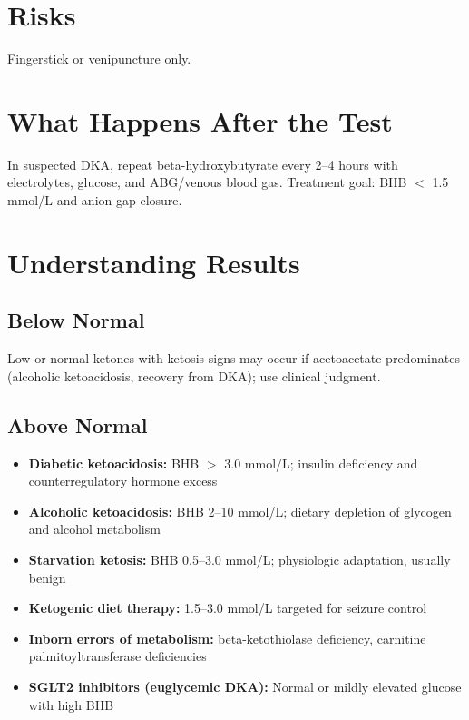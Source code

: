 \section*{Risks}
Fingerstick or venipuncture only.

\section*{What Happens After the Test}
In suspected DKA, repeat beta-hydroxybutyrate every 2--4 hours with electrolytes, glucose, and ABG/venous blood gas. Treatment goal: BHB $<$ 1.5 mmol/L and anion gap closure.

\section*{Understanding Results}

\subsection*{Below Normal}
Low or normal ketones with ketosis signs may occur if acetoacetate predominates (alcoholic ketoacidosis, recovery from DKA); use clinical judgment.

\subsection*{Above Normal}
\begin{itemize}
  \item \textbf{Diabetic ketoacidosis:} BHB $>$ 3.0 mmol/L; insulin deficiency and counterregulatory hormone excess
  \item \textbf{Alcoholic ketoacidosis:} BHB 2--10 mmol/L; dietary depletion of glycogen and alcohol metabolism
  \item \textbf{Starvation ketosis:} BHB 0.5--3.0 mmol/L; physiologic adaptation, usually benign
  \item \textbf{Ketogenic diet therapy:} 1.5--3.0 mmol/L targeted for seizure control
  \item \textbf{Inborn errors of metabolism:} beta-ketothiolase deficiency, carnitine palmitoyltransferase deficiencies
  \item \textbf{SGLT2 inhibitors (euglycemic DKA):} Normal or mildly elevated glucose with high BHB
\end{itemize}

